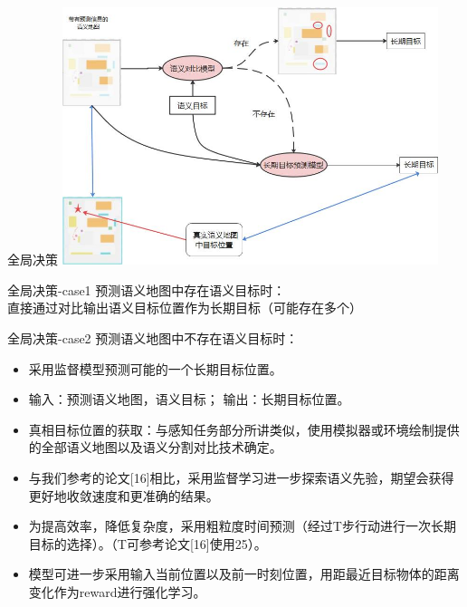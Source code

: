 \begin{frame}{全局决策}
    \centering
    \includegraphics[width=11cm]{assets/global_policy.png}
\end{frame}

\begin{frame}{全局决策-case1}
         预测语义地图中存在语义目标时：\\直接通过对比输出语义目标位置作为长期目标（可能存在多个）
\end{frame}

\begin{frame}{全局决策-case2}
     预测语义地图中不存在语义目标时：
              \begin{itemize}
                  \item 采用监督模型预测可能的一个长期目标位置。
                  \item 输入：预测语义地图，语义目标； 输出：长期目标位置。
                  \item 真相目标位置的获取：与感知任务部分所讲类似，使用模拟器或环境绘制提供的全部语义地图以及语义分割对比技术确定。
                  \item 与我们参考的论文[16]相比，采用监督学习进一步探索语义先验，期望会获得更好地收敛速度和更准确的结果。
                  \item 为提高效率，降低复杂度，采用粗粒度时间预测（经过T步行动进行一次长期目标的选择）。（T可参考论文[16]使用25）。
                  \item 模型可进一步采用输入当前位置以及前一时刻位置，用距最近目标物体的距离变化作为reward进行强化学习。
              \end{itemize}
\end{frame}